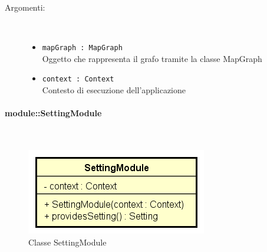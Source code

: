 \documentclass[../DefinizioneDiProdotto.tex]{subfiles}
\begin{document}
\begin{description}
\begin{itemize}
		\begin{description}
			\item[Argomenti:] \
			\begin{itemize}
				\item \texttt{mapGraph : MapGraph}\\
				Oggetto che rappresenta il grafo tramite la classe MapGraph\item \texttt{context : Context}\\
				Contesto di esecuzione dell'applicazione\end{itemize}
		\end{description}
	\end{itemize}
\end{description}

\paragraph{module::SettingModule}
\
\begin{figure}[H]
	\centering
	\includegraphics[width=\maxwidth]{img/SettingModule.png}
	\caption{Classe SettingModule}\label{fig:module::SettingModule} 
\end{figure}
\end{document}
